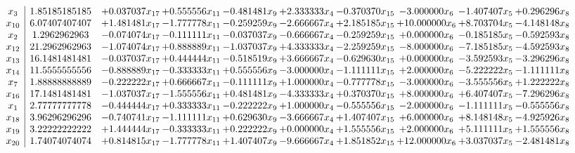 \documentclass[10pt]{article}
\begin{document}
 \[\begin{array}{c| c c@{\hskip 2pt} c@{\hskip 2pt} c@{\hskip 2pt} c@{\hskip 2pt} c@{\hskip 2pt} c@{\hskip 2pt} c@{\hskip 2pt} c@{\hskip 2pt} }
 x_{3}   &  1.85185185185 & + 0.037037 x_{17} & + 0.555556 x_{11} & -0.481481 x_{9} & + 2.333333 x_{4} & -0.370370 x_{15} & -3.000000 x_{6} & -1.407407 x_{5} & + 0.296296 x_{8}\\
 x_{10}   &  6.07407407407 & + 1.481481 x_{17} & -1.777778 x_{11} & -0.259259 x_{9} & -2.666667 x_{4} & + 2.185185 x_{15} & + 10.000000 x_{6} & + 8.703704 x_{5} & -4.148148 x_{8}\\
 x_{2}   &  1.2962962963 & -0.074074 x_{17} & -0.111111 x_{11} & -0.037037 x_{9} & -0.666667 x_{4} & -0.259259 x_{15} & + 0.000000 x_{6} & -0.185185 x_{5} & -0.592593 x_{8}\\
 x_{12}   &  21.2962962963 & -1.074074 x_{17} & + 0.888889 x_{11} & -1.037037 x_{9} & + 4.333333 x_{4} & -2.259259 x_{15} & -8.000000 x_{6} & -7.185185 x_{5} & -4.592593 x_{8}\\
 x_{13}   &  16.1481481481 & -0.037037 x_{17} & + 0.444444 x_{11} & -0.518519 x_{9} & + 3.666667 x_{4} & -0.629630 x_{15} & + 0.000000 x_{6} & -3.592593 x_{5} & -3.296296 x_{8}\\
 x_{14}   &  11.5555555556 & -0.888889 x_{17} & -0.333333 x_{11} & + 0.555556 x_{9} & -3.000000 x_{4} & -1.111111 x_{15} & + 2.000000 x_{6} & -5.222222 x_{5} & -1.111111 x_{8}\\
 x_{7}   &  1.88888888889 & -0.222222 x_{17} & + 0.666667 x_{11} & -0.111111 x_{9} & + 1.000000 x_{4} & -0.777778 x_{15} & -3.000000 x_{6} & -3.555556 x_{5} & + 1.222222 x_{8}\\
 x_{16}   &  17.1481481481 & -1.037037 x_{17} & -1.555556 x_{11} & + 0.481481 x_{9} & -4.333333 x_{4} & + 0.370370 x_{15} & + 8.000000 x_{6} & + 6.407407 x_{5} & -7.296296 x_{8}\\
 x_{1}   &  2.77777777778 & -0.444444 x_{17} & + 0.333333 x_{11} & -0.222222 x_{9} & + 1.000000 x_{4} & -0.555556 x_{15} & -2.000000 x_{6} & -1.111111 x_{5} & -0.555556 x_{8}\\
 x_{18}   &  3.96296296296 & -0.740741 x_{17} & -1.111111 x_{11} & + 0.629630 x_{9} & -3.666667 x_{4} & + 1.407407 x_{15} & + 6.000000 x_{6} & + 8.148148 x_{5} & -4.925926 x_{8}\\
 x_{19}   &  3.22222222222 & + 1.444444 x_{17} & -0.333333 x_{11} & + 0.222222 x_{9} & + 0.000000 x_{4} & + 1.555556 x_{15} & + 2.000000 x_{6} & + 5.111111 x_{5} & + 1.555556 x_{8}\\
 x_{20}   &  1.74074074074 & + 0.814815 x_{17} & -1.777778 x_{11} & + 1.407407 x_{9} & -9.666667 x_{4} & + 1.851852 x_{15} & + 12.000000 x_{6} & + 3.037037 x_{5} & -2.481481 x_{8}\\

\end{array}\]
\end{document}

